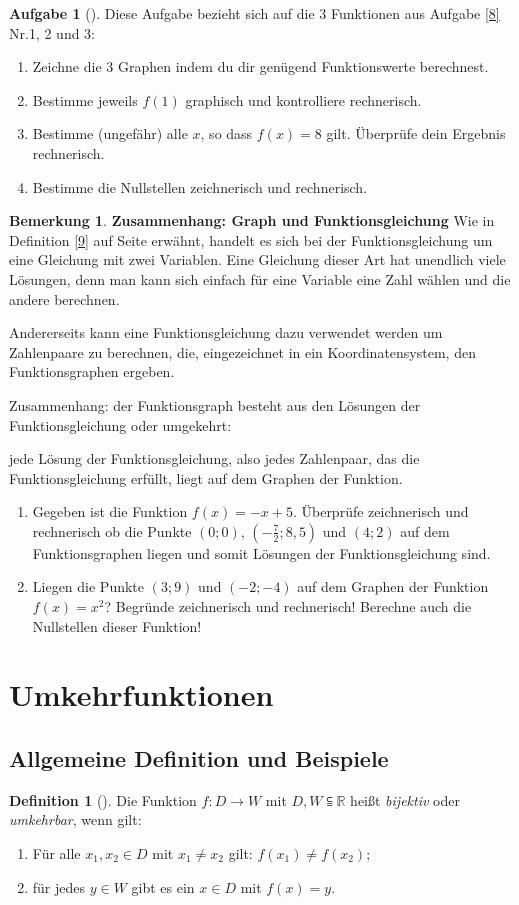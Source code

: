 \documentclass[a4paper, twoside, parskip, 10pt, smallheadings]{scrbook}
\theoremstyle{plain}
\theoremstyle{definition}
\newtheorem{Def}{Definition}%
\newtheorem{Auf}{Aufgabe}%
\newtheorem*{Bem}{Bemerkung}
\newenvironment{fshaded}{%
\def\FrameCommand{\fcolorbox{framecolor}{shadecolor}}%
\MakeFramed {\FrameRestore}}%
{\endMakeFramed}
\newenvironment{fdef}[1][]{\definecolor{shadecolor}{rgb}{1,1,.29}%
\definecolor{framecolor}{rgb}{1,1,0}%
\begin{fshaded}\begin{Def}[#1]}{\end{Def}\end{fshaded}}
\newenvironment{fauf}[1][]{\definecolor{shadecolor}{rgb}{.58,.788,1}%
\definecolor{framecolor}{rgb}{.13,.25,.9}%
\begin{fshaded}\begin{Auf}[#1]}{\end{Auf}\end{fshaded}}
\newcommand{\ba}{\begin{fauf}}
\newcommand{\ea}{\end{fauf}}
\newcommand{\bn}{\begin{enumerate}}
\newcommand{\en}{\end{enumerate}}
\newcommand{\bd}{\begin{fdef}}
\newcommand{\ed}{\end{fdef}}
\renewcommand{\subseteq}{\subseteqq}
\begin{document}
\ba
Diese Aufgabe bezieht sich auf die 3 Funktionen aus Aufgabe
\ref{8} Nr.1, 2 und 3:
\begin{enumerate}
\item Zeichne die 3 Graphen indem du dir gen\"{u}gend Funktionswerte berechnest.
\item Bestimme jeweils $f(1)$ graphisch und kontrolliere rechnerisch.
\item Bestimme (ungef\"{a}hr) alle $x$, so dass $f(x)=8$ gilt.
\"{U}berpr\"{u}fe dein Ergebnis rechnerisch.
\item Bestimme die Nullstellen zeichnerisch und rechnerisch.
\end{enumerate}
\ea

\begin{Bem}{\bf Zusammenhang: Graph und Funktionsgleichung}
Wie in Definition \ref{9} auf Seite \pageref{9} erw\"{a}hnt, handelt
es sich bei der Funktionsgleichung um eine Gleichung mit zwei
Variablen. Eine Gleichung dieser Art hat unendlich viele L\"{o}sungen,
denn man kann sich einfach f\"{u}r eine Variable eine Zahl w\"{a}hlen und
die andere berechnen.

Andererseits kann eine Funktionsgleichung dazu verwendet werden um
Zahlenpaare zu berechnen, die, eingezeichnet in ein
Koordinatensystem, den Funktionsgraphen ergeben.

Zusammenhang: der Funktionsgraph besteht aus den L\"{o}sungen der
Funktionsgleichung oder umgekehrt:

jede L\"{o}sung der Funktionsgleichung, also jedes Zahlenpaar, das die
Funktionsgleichung erf\"{u}llt, liegt auf dem Graphen der Funktion.
\end{Bem}

\bn \item 
Gegeben ist die Funktion $f(x)=-x+5$. \label{2.6} \"{U}berpr\"{u}fe
 zeichnerisch und  rechnerisch
ob die Punkte $(0;0)$, $(-\frac{7}{2};8,5)$ und $(4;2)$ auf dem Funktionsgraphen liegen und somit L\"{o}sungen
der Funktionsgleichung sind.
\item 
 Liegen die Punkte $(3;9)$ und $(-2;-4)$ auf dem Graphen der Funktion $f(x)=x^2$?  Begr\"{u}nde zeichnerisch und  rechnerisch! Berechne auch die  Nullstellen dieser Funktion! 
\en



\section{Umkehrfunktionen}

\subsection{Allgemeine Definition und Beispiele}
 \bd  Die Funktion $f: D \rightarrow W$ mit $D, W \subseteq \mathbb{R}$ hei{\ss}t {\it bijektiv} oder {\it
umkehrbar}, wenn gilt: \bn \item F\"{u}r alle $x_1, x_2 \in D$ mit $x_1 \neq x_2$ gilt: $f(x_1)\neq f(x_2)$;
\item f\"{u}r jedes $y \in W$ gibt es ein $x \in D$ mit $f(x)=y$.\en  \ed  
\end{document}

